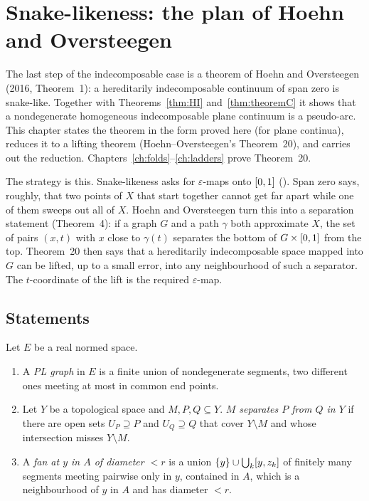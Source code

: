 \chapter{Snake-likeness: the plan of Hoehn and Oversteegen}\label{ch:snake}

The last step of the indecomposable case is a theorem of Hoehn and Oversteegen (2016, Theorem~1): a hereditarily indecomposable
continuum of span zero is snake-like. Together with Theorems~\ref{thm:HI} and~\ref{thm:theoremC} it shows that a nondegenerate homogeneous
indecomposable plane continuum is a pseudo-arc. This chapter states the theorem in the form proved here (for plane continua), reduces it to
a lifting theorem (Hoehn--Oversteegen's Theorem~20), and carries out the reduction. Chapters~\ref{ch:folds}--\ref{ch:ladders} prove
Theorem~20.

The strategy is this. Snake-likeness asks for $\varepsilon$-maps onto $[0,1]$ (). Span zero says, roughly, that two points
of $X$ that start together cannot get far apart while one of them sweeps out all of $X$. Hoehn and Oversteegen turn this into a separation
statement (Theorem~4): if a graph $G$ and a path $\gamma$ both approximate $X$, the set of pairs $(x,t)$ with $x$ close to $\gamma(t)$
separates the bottom of $G\times[0,1]$ from the top. Theorem~20 then says that a hereditarily indecomposable space mapped into $G$ can be lifted, up to
a small error, into any neighbourhood of such a separator. The $t$-coordinate of the lift is the required $\varepsilon$-map.

\section{Statements}

\begin{definition}\label{def:plgraph}
Let $E$ be a real normed space.
\begin{enumerate}[label=(\alph*)]
\item A \emph{PL graph} in $E$ is a finite union of nondegenerate segments, two different ones meeting at most in common end points.
\item Let $Y$ be a topological space and $M,P,Q\subseteq Y$. \emph{$M$ separates $P$ from $Q$ in $Y$} if there are open sets $U_P\supseteq P$ and
$U_Q\supseteq Q$ that cover $Y\setminus M$ and whose intersection misses $Y\setminus M$.
\item A \emph{fan at $y$ in $A$ of diameter $<r$} is a union $\left\{ y \right\}\cup\bigcup_k[y,z_k]$ of finitely many segments meeting pairwise only in $y$,
contained in $A$, which is a neighbourhood of $y$ in $A$ and has diameter $<r$.
\end{enumerate}
\end{definition}

